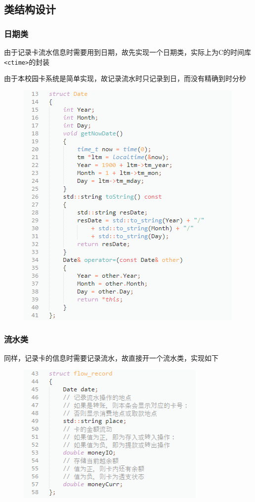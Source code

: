 \documentclass[11pt,UTF8]{ctexart}
\begin{document}
\subsection{类结构设计}
\subsubsection{日期类}
\par 由于记录卡流水信息时需要用到日期，故先实现一个日期类，实际上为C的时间库\verb'<ctime>'的封装
\par 由于本校园卡系统是简单实现，故记录流水时只记录到日，而没有精确到时分秒
\begin{figure}[H]
\centering
\includegraphics[width=0.5\linewidth]{pic/Date_struct.PNG}
\end{figure}

\subsubsection{流水类}
\par 同样，记录卡的信息时需要记录流水，故直接开一个流水类，实现如下
\begin{figure}[H]
\centering
\includegraphics[width=0.6\linewidth]{pic/fr_struct.PNG}
\end{figure}
\end{document}
